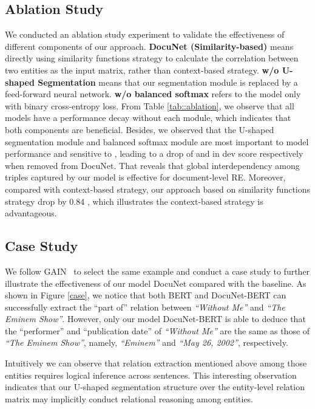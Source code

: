 \documentclass{article}
\begin{document}
\subsection{Ablation Study}
We conducted an ablation study experiment to validate the effectiveness of different components of our approach. \textbf{DocuNet (Similarity-based)}
 means directly using similarity functions strategy to calculate the correlation between two entities as the input matrix, rather than context-based strategy. \textbf{w/o U-shaped Segmentation} means that our segmentation module is replaced by a feed-forward neural network. \textbf{w/o balanced softmax} refers to the model only with binary cross-entropy loss. From Table \ref{tab::ablation}, we observe that all models have a performance decay without each module, which indicates that both components are beneficial. Besides, we observed that the U-shaped segmentation module and balanced softmax module are most important to model performance and sensitive to , leading to a drop of  and  in dev  score respectively when removed from DocuNet. That reveals that global interdependency among triples captured by our model is effective for document-level RE.
 Moreover, compared with context-based strategy, our approach based on similarity functions strategy drop by 0.84 , which illustrates the context-based strategy is advantageous. 


\subsection{Case Study}
We follow GAIN~\cite{zeng2020double} to select the same example and  conduct a case study to further illustrate the effectiveness of our model DocuNet compared with the baseline. As shown in Figure \ref{case}, we notice that both BERT and DocuNet-BERT can successfully extract the ``part of'' relation between \emph{``Without Me''} and  \emph{``The Eminem Show''}.
However, only our model DocuNet-BERT is able to deduce that the ``performer'' and ``publication date'' of \emph{``Without Me''} are the same as those of \emph{``The Eminem Show''}, namely, \emph{``Eminem''} and \emph{``May 26, 2002''}, respectively.

Intuitively we can observe that relation extraction mentioned above among those entities requires logical inference across sentences. This interesting observation indicates that our U-shaped segmentation structure over the entity-level relation matrix may implicitly conduct relational reasoning among entities. 
 
\end{document}
